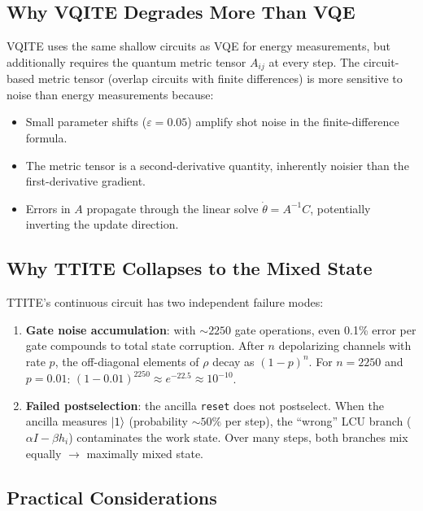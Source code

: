\documentclass[11pt,a4paper]{article}
\begin{document}
\subsection{Why VQITE Degrades More Than VQE}

VQITE uses the same shallow circuits as VQE for energy measurements, but
additionally requires the quantum metric tensor $A_{ij}$ at every step.
The circuit-based metric tensor (overlap circuits with finite differences)
is more sensitive to noise than energy measurements because:
\begin{itemize}[nosep]
  \item Small parameter shifts ($\varepsilon = 0.05$) amplify shot noise
    in the finite-difference formula.
  \item The metric tensor is a second-derivative quantity, inherently
    noisier than the first-derivative gradient.
  \item Errors in $A$ propagate through the linear solve
    $\dot{\theta} = A^{-1}C$, potentially inverting the update direction.
\end{itemize}

\subsection{Why TTITE Collapses to the Mixed State}

TTITE's continuous circuit has two independent failure modes:
\begin{enumerate}[nosep]
  \item \textbf{Gate noise accumulation}: with $\sim\!2250$ gate operations,
    even 0.1\% error per gate compounds to total state corruption.
    After $n$ depolarizing channels with rate $p$, the off-diagonal elements
    of $\rho$ decay as $(1-p)^n$. For $n=2250$ and $p=0.01$:
    $(1-0.01)^{2250} \approx e^{-22.5} \approx 10^{-10}$.
  \item \textbf{Failed postselection}: the ancilla \texttt{reset}
    does not postselect. When the ancilla measures $\ket{1}$
    (probability $\sim\!50\%$ per step), the ``wrong'' LCU branch
    ($\alpha I - \beta h_i$) contaminates the work state. Over many
    steps, both branches mix equally $\to$ maximally mixed state.
\end{enumerate}

\subsection{Practical Considerations}
\end{document}
